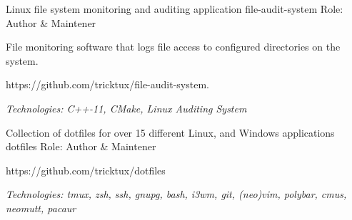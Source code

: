 

\begin{cventries}
  \cventry
  {Linux file system monitoring and auditing application} %
  {file-audit-system} %
  {} %
  {Role: Author \& Maintener} %
  {
    \begin{cvitems} %
    \item {File monitoring software that logs file access to configured directories on the system.}
    \item {https://github.com/tricktux/file-audit-system.}
    \item {\it{Technologies:} C++-11, CMake, Linux Auditing System}
    \end{cvitems}
  }

  \cventry
		{Collection of dotfiles for over 15 different Linux, and Windows applications} %
    {dotfiles} %
    {} %
		{Role: Author \& Maintener} %
    {
      \begin{cvitems} %
				\item {https://github.com/tricktux/dotfiles}
				\item {\it{Technologies:} tmux, zsh, ssh, gnupg, bash, i3wm, git, (neo)vim, polybar, cmus, neomutt, pacaur}
      \end{cvitems}
    }


\end{cventries}

